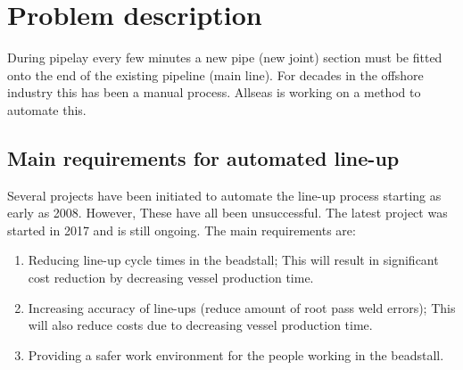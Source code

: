 \section{Problem description} \label{sec:problem}
During pipelay every few minutes a new pipe (new joint) section must be fitted onto the end of the existing pipeline (main line).
For decades in the offshore industry this has been a manual process. Allseas is working on a method to automate this.

\subsection{Main requirements for automated line-up}
Several projects have been initiated to automate the line-up process starting as early as 2008. However, These have all been
unsuccessful. The latest project was started in 2017 and is still ongoing. The main requirements are:
\begin{enumerate}
      \item Reducing line-up cycle times in the beadstall; This will result in significant cost reduction by
            decreasing vessel production time.
      \item Increasing accuracy of line-ups (reduce amount of root pass weld errors); This will also reduce
            costs due to decreasing vessel production time.
      \item Providing a safer work environment for the people working in the beadstall.
\end{enumerate}

